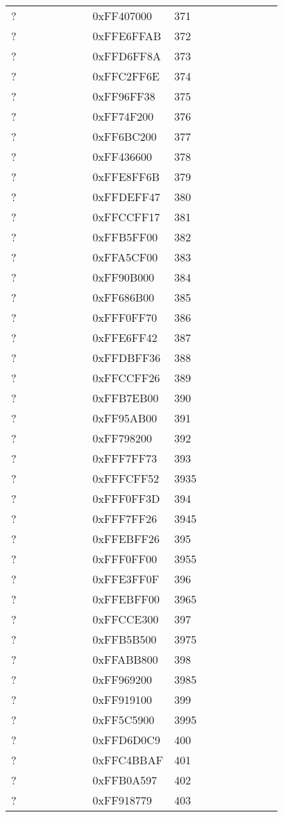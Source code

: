 \begin{longtable}{p{0.3\linewidth} p{0.3\linewidth} p{0.4\linewidth}}
? &  0xFF407000 &  371\\
? &  0xFFE6FFAB &  372\\
? &  0xFFD6FF8A &  373\\
? &  0xFFC2FF6E &  374\\
? &  0xFF96FF38 &  375\\
? &  0xFF74F200 &  376\\
? &  0xFF6BC200 &  377\\
? &  0xFF436600 &  378\\
? &  0xFFE8FF6B &  379\\
? &  0xFFDEFF47 &  380\\
? &  0xFFCCFF17 &  381\\
? &  0xFFB5FF00 &  382\\
? &  0xFFA5CF00 &  383\\
? &  0xFF90B000 &  384\\
? &  0xFF686B00 &  385\\
? &  0xFFF0FF70 &  386\\
? &  0xFFE6FF42 &  387\\
? &  0xFFDBFF36 &  388\\
? &  0xFFCCFF26 &  389\\
? &  0xFFB7EB00 &  390\\
? &  0xFF95AB00 &  391\\
? &  0xFF798200 &  392\\
? &  0xFFF7FF73 &  393\\
? &  0xFFFCFF52 &  3935\\
? &  0xFFF0FF3D &  394\\
? &  0xFFF7FF26 &  3945\\
? &  0xFFEBFF26 &  395\\
? &  0xFFF0FF00 &  3955\\
? &  0xFFE3FF0F &  396\\
? &  0xFFEBFF00 &  3965\\
? &  0xFFCCE300 &  397\\
? &  0xFFB5B500 &  3975\\
? &  0xFFABB800 &  398\\
? &  0xFF969200 &  3985\\
? &  0xFF919100 &  399\\
? &  0xFF5C5900 &  3995\\
? &  0xFFD6D0C9 &  400\\
? &  0xFFC4BBAF &  401\\
? &  0xFFB0A597 &  402\\
? &  0xFF918779 &  403\\

\end{longtable}
